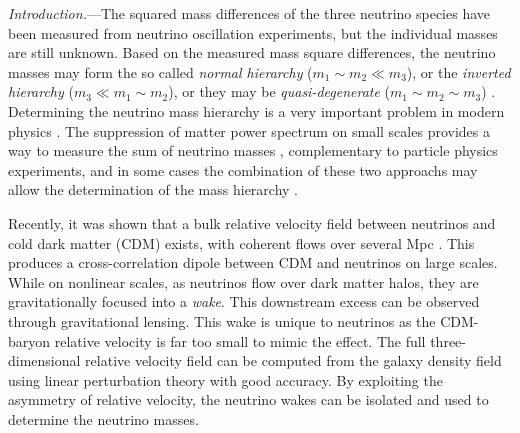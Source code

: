 \documentclass[aps,prl,twocolumn,showpacs,superscriptaddress,groupedaddress,nofootinbib]{revtex4}  %
\begin{document}
{\it Introduction.}---The squared mass differences of the three neutrino species 
have been measured from neutrino oscillation experiments, but 
the individual masses are still unknown. Based on the measured mass square 
differences, the neutrino masses may form the so called {\it normal 
hierarchy} ($m_1 \sim m_2 \ll m_3$), or the {\it inverted 
hierarchy} ($m_3 \ll m_1 \sim m_2$), or  they may be {\it quasi-degenerate} 
($m_1 \sim m_2 \sim m_3$) \cite{2014ChPhC..38i0001O}. 
Determining the neutrino mass hierarchy is a very
important problem in modern physics \cite{2013arXiv1307.5487C}. 
The suppression of matter power spectrum on small scales  
provides a way to measure the sum of neutrino 
masses \cite{Bond:1980,Hu:1997}, complementary 
to particle physics experiments, and in some cases 
the combination of these two approachs may
allow the determination of the mass hierarchy \cite{Dodelson:2014}. 

Recently, it was shown that  a bulk relative velocity field between 
neutrinos and cold dark matter (CDM)
exists, with coherent flows over several Mpc \cite{Zhu:2013}.
This produces a cross-correlation dipole between CDM and neutrinos on large
scales. While on nonlinear scales,
as neutrinos flow over dark matter halos, they are gravitationally focused
into a {\it wake}.  This downstream excess can be observed
through gravitational lensing. This wake is unique to
neutrinos as the CDM-baryon relative velocity is far too small to
mimic the effect.  The full three-dimensional relative velocity field can be
computed from the galaxy density field using linear perturbation 
theory with good accuracy.
By exploiting the asymmetry of relative velocity, the neutrino wakes
can be isolated and used to determine the neutrino masses.
\end{document}
